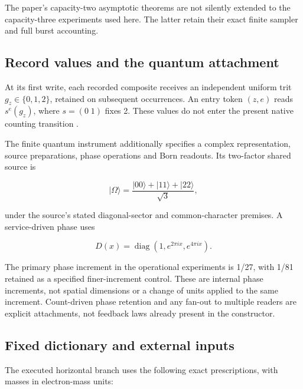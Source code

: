 \documentclass[11pt,a4paper]{article}
\begin{document}
The paper's capacity-two asymptotic theorems are not silently extended to the capacity-three experiments used here. The latter retain their exact finite sampler and full burst accounting.

\subsection{Record values and the quantum attachment}\label{record-values-and-the-quantum-attachment}

At its first write, each recorded composite receives an independent uniform trit \(g_z\in\{0,1,2\}\), retained on subsequent occurrences. An entry token \((z,e)\) reads \(s^e(g_z)\), where \(s=(0\;1)\) fixes 2. These values do not enter the present native counting transition \cite[Section 5]{D2}.

The finite quantum instrument additionally specifies a complex representation, source preparations, phase operations and Born readouts. Its two-factor shared source is

\begin{equation}\label{eq:4}
|\Omega\rangle=\frac{|00\rangle+|11\rangle+|22\rangle}{\sqrt3},
\end{equation}

under the source's stated diagonal-sector and common-character premises. A service-driven phase uses

\begin{equation}\label{eq:5}
D(x)=\operatorname{diag}(1,e^{2\pi ix},e^{4\pi ix}).
\end{equation}

The primary phase increment in the operational experiments is 1/27, with 1/81 retained as a specified finer-increment control. These are internal phase increments, not spatial dimensions or a change of units applied to the same increment. Count-driven phase retention and any fan-out to multiple readers are explicit attachments, not feedback laws already present in the constructor.

\subsection{Fixed dictionary and external inputs}\label{fixed-dictionary-and-external-inputs}

The executed horizontal branch uses the following exact prescriptions, with masses in electron-mass units:
\end{document}
